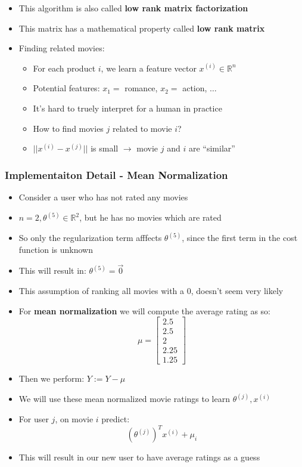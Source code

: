 \begin{itemize}[--]
	\item This algorithm is also called \textbf{low rank matrix factorization}
	\item This matrix has a mathematical property called \textbf{low rank matrix}
	\item Finding related movies:
	\begin{itemize}[--]
		\item For each product $i$, we learn a feature vector $x^{(i)}\in\mathbb{R}^n$
		\item Potential features: $x_1 = $ romance, $x_2 = $ action, $\ldots$
		\item It's hard to truely interpret for a human in practice
		\item How to find movies $j$ related to movie $i$?
		\item $||x^{(i)} - x^{(j)}||$ is small $\to$ movie $j$ and $i$ are ``similar'' 
	\end{itemize}
\end{itemize}

\subsubsection{Implementaiton Detail - Mean Normalization}
\begin{itemize}[--]
	\item Consider a user who has not rated any movies
	\item $n=2, \theta^{(5)}\in\mathbb{R}^2$, but he has no movies which are rated
	\item So only the regularization term afffects $\theta^{(5)}$, since the first term in the cost function is unknown
	\item This will result in: $\theta^{(5)}=\vec{0}$
	\item This assumption of ranking all movies with a 0, doesn't seem very likely
	\item For \textbf{mean normalization} we will compute the average rating as so:
		$$\mu=\begin{bmatrix}
			2.5 \\ 2.5 \\ 2 \\ 2.25 \\ 1.25
		\end{bmatrix}$$
	\item Then we perform: $Y:= Y - \mu$
	\item We will use these mean normalized movie ratings to learn $\theta^{(j)}, x^{(i)}$
	\item For user $j$, on movie $i$ predict:
		$$(\theta^{(j)})^Tx^{(i)} + \mu_i$$
	\item This will result in our new user to have average ratings as a guess
 \end{itemize}